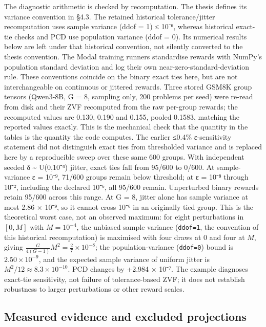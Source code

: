 \documentclass[12pt,a4paper]{report}
\begin{document}
The diagnostic arithmetic is checked by recomputation. The thesis
defines its variance convention in §4.3. The retained historical
tolerance/jitter recomputation uses sample variance (ddof = 1) ≤ 10⁻⁶,
whereas historical exact-tie checks and PCD use population variance
(ddof = 0). Its numerical results below are left under that historical
convention, not silently converted to the thesis convention. The Modal
training runners standardise rewards with NumPy's population standard
deviation and log their own near-zero-standard-deviation rule. These
conventions coincide on the binary exact ties here, but are not
interchangeable on continuous or jittered rewards. Three stored GSM8K
group tensors (Qwen3-8B, G = 8, sampling only, 200 problems per seed)
were re-read from disk and their ZVF recomputed from the raw per-group
rewards; the recomputed values are 0.130, 0.190 and 0.155, pooled
0.1583, matching the reported values exactly. This is the mechanical
check that the quantity in the tables is the quantity the code computes.
The earlier ≤0.4\% ε-sensitivity statement did not distinguish exact
ties from thresholded variance and is replaced here by a reproducible
sweep over these same 600 groups. With independent seeded δ
\textasciitilde{} U(0,10⁻⁴) jitter, exact ties fall from 95/600 to
0/600. At sample-variance ε = 10⁻⁹, 71/600 groups remain below
threshold; at ε = 10⁻⁸ through 10⁻², including the declared 10⁻⁶, all
95/600 remain. Unperturbed binary rewards retain 95/600 across this
range. At G = 8, jitter alone has sample variance at most 2.86 × 10⁻⁹,
so it cannot cross 10⁻⁶ in an originally tied group. This is the
theoretical worst case, not an observed maximum: for eight perturbations
in \([0, M]\) with \(M = 10^{-4}\), the unbiased sample variance
(\texttt{ddof=1}, the convention of this historical recomputation) is
maximised with four draws at 0 and four at \(M\), giving
\(\frac{G}{4(G-1)}M^2 = \frac{2}{7}\times10^{-8}\); the
population-variance (\texttt{ddof=0}) bound is \(2.50\times10^{-9}\),
and the expected sample variance of uniform jitter is
\(M^2/12 \approx 8.3\times10^{-10}\). PCD changes by +2.984 × 10⁻⁷. The
example diagnoses exact-tie sensitivity, not failure of tolerance-based
ZVF; it does not establish robustness to larger perturbations or other
reward scales.

\subsection{Measured evidence and excluded
projections}\label{measured-evidence-and-excluded-projections}
\end{document}
